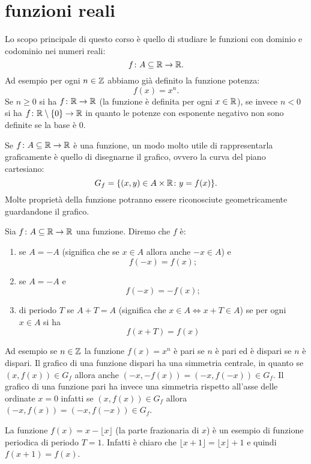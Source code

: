 
\section{funzioni reali}

Lo scopo principale di questo corso è quello di studiare le
funzioni con dominio e codominio nei numeri reali:
\[
  f \colon A \subseteq \mathbb R \to \mathbb R.
\]
Ad esempio per ogni $n\in \mathbb Z$ abbiamo già definito la funzione
potenza:
\[
  f(x) = x^n.
\]
Se $n\ge 0$ si ha $f\colon \mathbb R \to \mathbb R$ (la funzione è definita
per ogni $x\in \mathbb R$), se invece $n<0$ si ha
$f\colon \mathbb R\setminus{\left\{ 0 \right\}}\to \mathbb R$ in quanto le potenze
con esponente negativo non sono definite se la base è $0$.

Se $f\colon A \subseteq \mathbb R\to \mathbb R$ è una funzione, un modo molto
utile di rappresentarla graficamente è quello di disegnarne il
grafico, ovvero la curva del piano cartesiano:
\[
   G_f = {\left\{ (x,y)\in A\times \mathbb R\colon y = f(x) \right\}}.
\]
Molte proprietà della funzione potranno essere riconosciute
geometricamente guardandone il grafico.

\begin{definition}[simmetrie]
Sia $f\colon A \subseteq \mathbb R \to \mathbb R$ una funzione.
Diremo che $f$ è:
\begin{enumerate}
\item {}
%
se $A=-A$ (significa che se $x\in A$ allora anche $-x\in A$) e
\[
  f(-x) = f(x);
\]
\item {}
%
se $A=-A$ e
\[
  f(-x) = -f(x);
\]
\item {}
%
di periodo $T$ se $A+T=A$
(significa che $x\in A \iff x+T \in A$)
se per ogni $x\in A$ si ha
\[
  f(x+T)=f(x)
\]
\end{enumerate}
\end{definition}

Ad esempio se $n\in \mathbb Z$ la funzione $f(x)=x^n$
è pari se $n$ è pari ed è dispari se $n$ è dispari.
Il grafico di una funzione dispari ha una simmetria
centrale, in quanto se $(x,f(x))\in G_f$ allora
anche $(-x,-f(x)) = (-x,f(-x))\in G_f$.
Il grafico di una funzione pari ha invece una
simmetria rispetto all'asse delle ordinate $x=0$
infatti se $(x,f(x))\in G_f$ allora $(-x,f(x)) = (-x,f(-x)) \in G_f$.

La funzione $f(x) = x - \lfloor x\rfloor$ (la parte frazionaria di $x$)
è un esempio di funzione periodica di periodo $T=1$. Infatti
è chiaro che $\lfloor x+1\rfloor = \lfloor x \rfloor +1$ e quindi
$f(x+1)=f(x)$.

